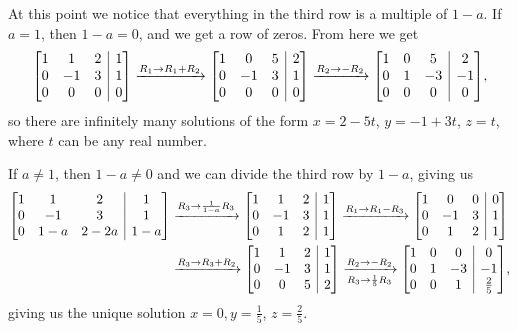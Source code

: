 \documentclass[12pt]{article}
\makeatletter
\newenvironment{amatrix}[1]{%
  \left[\begin{array}{@{}*{#1}{c}|c@{}}
}{%
  \end{array}\right]
}
\newcommand{\bam}{\begin{amatrix}}
\newcommand{\eam}{\end{amatrix}}
\makeatother
\begin{document}
\begin{enumerate}
At this point we notice that everything in the third row is a multiple of $1-a$. If $a=1$, then $1-a=0$, and we get a row of zeros. From here we get
\[
 \bam{3}1&1&2&1\\0&-1&3&1\\0&0&0&0\eam\xrightarrow{R_1\to R_1+R_2}\bam{3}1&0&5&2\\0&-1&3&1\\0&0&0&0\eam\xrightarrow{R_2\to -R_2}\bam{3}1&0&5&2\\0&1&-3&-1\\0&0&0&0\eam,
\]
so there are infinitely many solutions of the form $x=2-5t$, $y=-1+3t$, $z=t$, where $t$ can be any real number.

If $a\neq 1$, then $1-a\neq 0$ and we can divide the third row by $1-a$, giving us
\begin{align*}
 \bam{3}1&1&2&1\\0&-1&3&1\\0&1-a&2-2a&1-a\eam&\xrightarrow{R_3\to \frac{1}{1-a}R_3}\bam{3}1&1&2&1\\0&-1&3&1\\0&1&2&1\eam \xrightarrow{R_1\to R_1-R_3}\bam{3}1&0&0&0\\0&-1&3&1\\0&1&2&1\eam\\
&\xrightarrow{R_3\to R_3+R_2}\bam{3}1&1&2&1\\0&-1&3&1\\0&0&5&2\eam\xrightarrow[R_3\to \frac{1}{5}R_3]{R_2\to -R_2} \bam{3}1&0&0&0\\0&1&-3&-1\\0&0&1&\frac{2}{5}\eam,
\end{align*}
giving us the unique solution $x=0, y=\frac{1}{5}$, $z=\frac{2}{5}$.


\end{enumerate}
\end{document}
